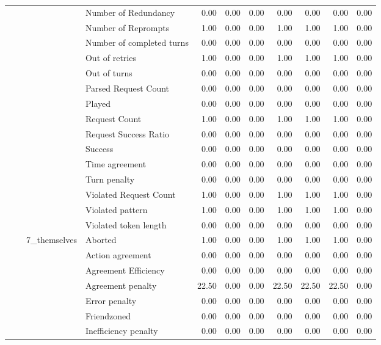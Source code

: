 \begin{tabular}{llllrrrrrrr}
 &  &  & Number of Redundancy & 0.00 & 0.00 & 0.00 & 0.00 & 0.00 & 0.00 & 0.00 \\
 &  &  & Number of Reprompts & 1.00 & 0.00 & 0.00 & 1.00 & 1.00 & 1.00 & 0.00 \\
 &  &  & Number of completed turns & 0.00 & 0.00 & 0.00 & 0.00 & 0.00 & 0.00 & 0.00 \\
 &  &  & Out of retries & 1.00 & 0.00 & 0.00 & 1.00 & 1.00 & 1.00 & 0.00 \\
 &  &  & Out of turns & 0.00 & 0.00 & 0.00 & 0.00 & 0.00 & 0.00 & 0.00 \\
 &  &  & Parsed Request Count & 0.00 & 0.00 & 0.00 & 0.00 & 0.00 & 0.00 & 0.00 \\
 &  &  & Played & 0.00 & 0.00 & 0.00 & 0.00 & 0.00 & 0.00 & 0.00 \\
 &  &  & Request Count & 1.00 & 0.00 & 0.00 & 1.00 & 1.00 & 1.00 & 0.00 \\
 &  &  & Request Success Ratio & 0.00 & 0.00 & 0.00 & 0.00 & 0.00 & 0.00 & 0.00 \\
 &  &  & Success & 0.00 & 0.00 & 0.00 & 0.00 & 0.00 & 0.00 & 0.00 \\
 &  &  & Time agreement & 0.00 & 0.00 & 0.00 & 0.00 & 0.00 & 0.00 & 0.00 \\
 &  &  & Turn penalty & 0.00 & 0.00 & 0.00 & 0.00 & 0.00 & 0.00 & 0.00 \\
 &  &  & Violated Request Count & 1.00 & 0.00 & 0.00 & 1.00 & 1.00 & 1.00 & 0.00 \\
 &  &  & Violated pattern & 1.00 & 0.00 & 0.00 & 1.00 & 1.00 & 1.00 & 0.00 \\
 &  &  & Violated token length & 0.00 & 0.00 & 0.00 & 0.00 & 0.00 & 0.00 & 0.00 \\
\cline{3-11}
 &  & \multirow[t]{27}{*}{7_themselves} & Aborted & 1.00 & 0.00 & 0.00 & 1.00 & 1.00 & 1.00 & 0.00 \\
 &  &  & Action agreement & 0.00 & 0.00 & 0.00 & 0.00 & 0.00 & 0.00 & 0.00 \\
 &  &  & Agreement Efficiency & 0.00 & 0.00 & 0.00 & 0.00 & 0.00 & 0.00 & 0.00 \\
 &  &  & Agreement penalty & 22.50 & 0.00 & 0.00 & 22.50 & 22.50 & 22.50 & 0.00 \\
 &  &  & Error penalty & 0.00 & 0.00 & 0.00 & 0.00 & 0.00 & 0.00 & 0.00 \\
 &  &  & Friendzoned & 0.00 & 0.00 & 0.00 & 0.00 & 0.00 & 0.00 & 0.00 \\
 &  &  & Inefficiency penalty & 0.00 & 0.00 & 0.00 & 0.00 & 0.00 & 0.00 & 0.00 \\

\end{tabular}
